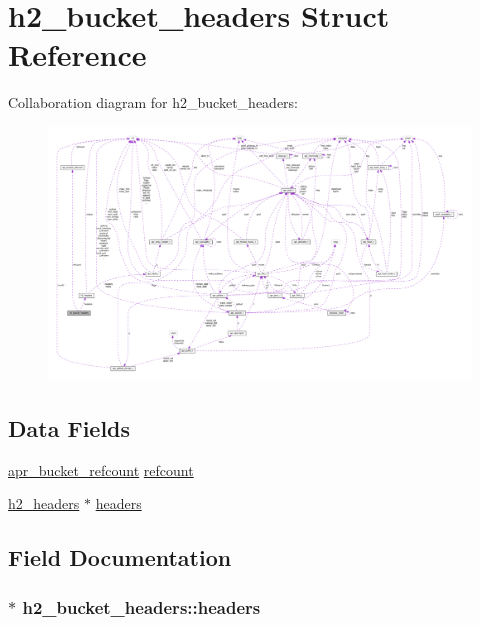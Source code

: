 \hypertarget{structh2__bucket__headers}{}\section{h2\+\_\+bucket\+\_\+headers Struct Reference}
\label{structh2__bucket__headers}


Collaboration diagram for h2\+\_\+bucket\+\_\+headers\+:
\nopagebreak
\begin{figure}[H]
\begin{center}
\leavevmode
\includegraphics[width=350pt]{structh2__bucket__headers__coll__graph}
\end{center}
\end{figure}
\subsection*{Data Fields}
\begin{DoxyCompactItemize}
\item 
\hyperlink{structapr__bucket__refcount}{apr\+\_\+bucket\+\_\+refcount} \hyperlink{structh2__bucket__headers_a0e9a661efb134b4d7b62b046d0e35b37}{refcount}
\item 
\hyperlink{structh2__headers}{h2\+\_\+headers} $\ast$ \hyperlink{structh2__bucket__headers_a7559e171cb431a3a8ee333f3ad3ea6cf}{headers}
\end{DoxyCompactItemize}


\subsection{Field Documentation}
\subsubsection[{\texorpdfstring{headers}{headers}}]{$\ast$ h2\+\_\+bucket\+\_\+headers\+::headers}\hypertarget{structh2__bucket__headers_a7559e171cb431a3a8ee333f3ad3ea6cf}{}\label{structh2__bucket__headers_a7559e171cb431a3a8ee333f3ad3ea6cf}
